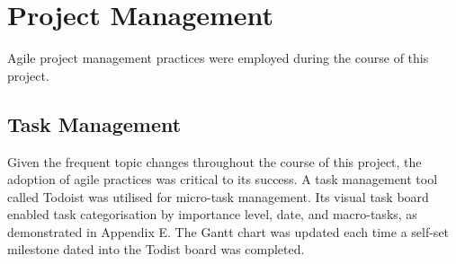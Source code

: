 




\section {Project Management}

Agile project management practices were employed during the course of this project. 

\subsection{Task Management}

Given the frequent topic changes throughout the course of this project, the adoption of agile practices was critical to its success. A task management tool called Todoist was utilised for micro-task management. Its visual task board enabled task categorisation by importance level, date, and macro-tasks, as demonstrated in Appendix E. The Gantt chart was updated each time a self-set milestone dated into the Todist board was completed.

